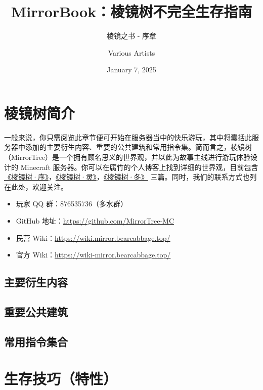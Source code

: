 \documentclass[lang=cn,newtx,10pt,scheme=chinese]{elegantbook}
\title{MirrorBook：棱镜树不完全生存指南}
\subtitle{棱镜之书 - 序章}
\author{Various Artists}
\institute{Mirror\LaTeX{} Project}
\date{January 7, 2025}
\begin{document}
\maketitle
\frontmatter

\tableofcontents

\mainmatter

\chapter{棱镜树简介}

一般来说，你只需阅览此章节便可开始在服务器当中的快乐游玩，其中将囊括此服务器中添加的主要衍生内容、重要的公共建筑和常用指令集。简而言之，棱镜树（MirrorTree）是一个拥有顾名思义的世界观，并以此为故事主线进行游玩体验设计的 Minecraft 服务器。你可以在腐竹的个人博客上找到详细的世界观，目前包含 \href{https://vichain.cn/tale/30}{《棱镜树·序》}，\href{https://vichain.cn/tale/41}{《棱镜树·灵》}，\href{https://vichain.cn/tale/54}{《棱镜树·冬》} 三篇。同时，我们的联系方式也列在此处，欢迎关注。

\begin{itemize}
    \item 玩家 QQ 群：876535736（多水群）
    \item GitHub 地址：\href{https://github.com/MirrorTree-MC}{https://github.com/MirrorTree-MC}
    \item 民营 Wiki：\href{https://wiki.mirror.bearcabbage.top/}{https://wiki.mirror.bearcabbage.top/}
    \item 官方 Wiki：\href{https://wiki-mirror.bearcabbage.top/}{https://wiki-mirror.bearcabbage.top/}
\end{itemize}

\section{主要衍生内容}

\section{重要公共建筑}

\section{常用指令集合}

\chapter{生存技巧（特性）}
\end{document}
